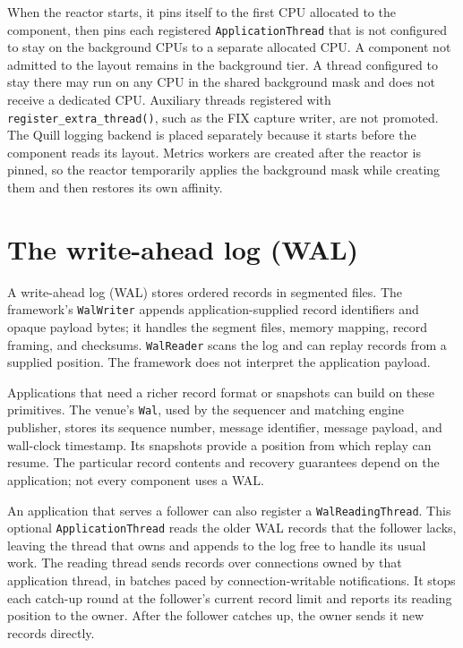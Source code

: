 When the reactor starts, it pins itself to the first CPU allocated to the
component, then pins each registered \texttt{ApplicationThread} that is not
configured to stay on the background CPUs to a separate allocated CPU. A
component not admitted to the layout remains in the background tier. A thread
configured to stay there may run on any CPU in the shared background mask and
does not receive a dedicated CPU. Auxiliary threads registered with
\texttt{register\_extra\_thread()}, such as the FIX capture writer, are not
promoted. The Quill logging backend is placed separately because it starts
before the component reads its layout. Metrics workers are created after the
reactor is pinned, so the reactor temporarily applies the background mask
while creating them and then restores its own affinity.

\section{The write-ahead log (WAL)}
\label{sec:fw_wal}

A write-ahead log (WAL) stores ordered records in segmented files. The
framework's \texttt{WalWriter} appends application-supplied record identifiers
and opaque payload bytes; it handles the segment files, memory mapping, record
framing, and checksums. \texttt{WalReader} scans the log and can replay records
from a supplied position. The framework does not interpret the application
payload.

Applications that need a richer record format or snapshots can build on these
primitives. The venue's \texttt{Wal}, used by the sequencer and matching engine
publisher, stores its sequence number, message identifier, message payload,
and wall-clock timestamp. Its snapshots provide a position from which replay
can resume. The particular record contents and recovery guarantees depend on
the application; not every component uses a WAL.

An application that serves a follower can also register a
\texttt{WalReadingThread}. This optional \texttt{ApplicationThread} reads the
older WAL records that the follower lacks, leaving the thread that owns and
appends to the log free to handle its usual work. The reading thread sends
records over connections owned by that application thread, in batches paced
by connection-writable notifications. It stops each catch-up round at the
follower's current record limit and reports its reading position to the owner.
After the follower catches up, the owner sends it new records directly.

